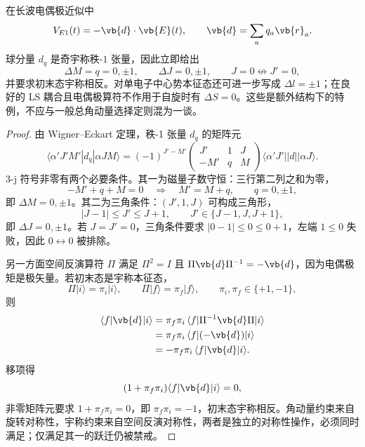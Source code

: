 在长波电偶极近似中
\[
V_{E1}(t)=-\vb{d}\cdot\vb{E}(t),
\qquad
\vb{d}=\sum_a q_a\vb{r}_a.
\]
球分量 $d_q$ 是奇宇称秩-$1$ 张量，因此立即给出
\begin{equation}
\Delta M=q=0,\pm1,
\qquad
\Delta J=0,\pm1,
\qquad
J=0\not\leftrightarrow J'=0,
\label{eq:e1-angular-selection}
\end{equation}
并要求初末态宇称相反。对单电子中心势本征态还可进一步写成 $\Delta l=\pm1$；在良好的 LS 耦合且电偶极算符不作用于自旋时有 $\Delta S=0$。这些是额外结构下的特例，不应与一般总角动量选择定则混为一谈。

\begin{proof}
由 Wigner--Eckart 定理，秩-1 张量 $d_q$ 的矩阵元
\begin{equation*}
 \langle \alpha'J'M'|d_q|\alpha JM\rangle
 =(-1)^{J'-M'}
 \begin{pmatrix}J'&1&J\\-M'&q&M\end{pmatrix}
 \langle\alpha'J'||d||\alpha J\rangle.
\end{equation*}
3-j 符号非零有两个必要条件。其一为磁量子数守恒：三行第二列之和为零，
\begin{equation*}
 -M'+q+M=0
 \quad\Longrightarrow\quad
 M'=M+q,
 \qquad q=0,\pm1,
\end{equation*}
即 $\Delta M=0,\pm1$。其二为三角条件：$(J',1,J)$ 可构成三角形，
\begin{equation*}
 |J-1|\le J'\le J+1,
 \qquad
 J'\in\{J-1,J,J+1\},
\end{equation*}
即 $\Delta J=0,\pm1$。若 $J=J'=0$，三角条件要求 $|0-1|\le0\le0+1$，左端 $1\le0$ 失败，因此 $0\leftrightarrow0$ 被排除。

另一方面空间反演算符 $\Pi$ 满足 $\Pi^2=I$ 且 $\Pi\vb{d}\Pi^{-1}=-\vb{d}$，因为电偶极矩是极矢量。若初末态是宇称本征态，
\begin{equation*}
 \Pi|i\rangle=\pi_i|i\rangle,
 \qquad
 \Pi|f\rangle=\pi_f|f\rangle,
 \qquad
 \pi_i,\pi_f\in\{+1,-1\},
\end{equation*}
则
\begin{align*}
 \langle f|\vb{d}|i\rangle
 &=\pi_f\pi_i\,\langle f|\Pi^{-1}\vb{d}\Pi|i\rangle\\
 &=\pi_f\pi_i\,\langle f|(-\vb{d})|i\rangle\\
 &=-\pi_f\pi_i\,\langle f|\vb{d}|i\rangle.
\end{align*}
移项得
\begin{equation*}
 (1+\pi_f\pi_i)\langle f|\vb{d}|i\rangle=0,
\end{equation*}
非零矩阵元要求 $1+\pi_f\pi_i=0$，即 $\pi_f\pi_i=-1$，初末态宇称相反。角动量约束来自旋转对称性，宇称约束来自空间反演对称性，两者是独立的对称性操作，必须同时满足；仅满足其一的跃迁仍被禁戒。
\end{proof}

